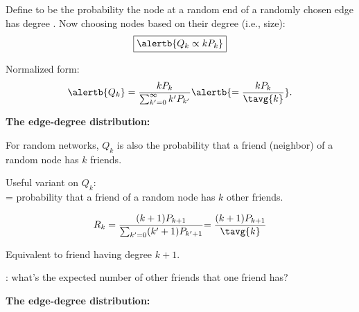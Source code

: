 \begin{frame}[label=]
\begin{frame}[label=]
\begin{frame}[label=]
\begin{frame}[label=]
\begin{frame}[label=]
\begin{frame}[label=]
\begin{frame}[label=]
\begin{frame}[label=]
\begin{frame}[label=]
\begin{frame}[label=]
\begin{frame}[label=]
\begin{frame}[label=]
\begin{frame}[label=]
\begin{frame}[label=]
\begin{frame}[label=]
    Define  to be the 
    probability the node at a \alert{random end}
    of a \alert{randomly chosen edge} has
    degree .
   Now choosing nodes based on their degree (i.e., size):
    $$
    \boxed{
      \alertb{Q_k \propto k P_k}
    }
    $$
  
    Normalized form:
    $$
    \alertb{Q_k} = \frac{kP_k}{\sum_{k'=0}^{\infty} k' P_{k'}}
    
    {
      \alertb{= \frac{kP_k}{\tavg{k}}}.
    }
    $$
  


\begin{frame}[label=]
  \textbf{The edge-degree distribution:}

    
     
      For random networks, $Q_k$ is also the probability
      that a friend (neighbor) of a random node has \alert{$k$ friends}.
     
      Useful variant on $Q_k$:\\
      \bigskip
      = probability that a friend of a random node
      has \alert{$k$ other friends}.
    
      $$
      R_k
      =
      \frac{(k+1)P_{k+1}}
      {\sum_{k'=0} (k'+1) P_{k'+1}}
      {
        =
        \frac{(k+1)P_{k+1}}
        {\tavg{k}}
      }
      $$
    
      Equivalent to friend having degree $k+1$.
    
      : what's the expected
      number of other friends that one friend has?
    


\begin{frame}[label=]
  \textbf{The edge-degree distribution:}
  \small
    

\end{frame}
\end{frame}
\end{frame}
\end{frame}
\end{frame}
\end{frame}
\end{frame}
\end{frame}
\end{frame}
\end{frame}
\end{frame}
\end{frame}
\end{frame}
\end{frame}
\end{frame}
\end{frame}
\end{frame}

